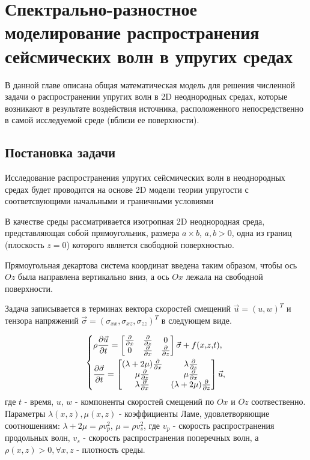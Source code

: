 \section{Спектрально-разностное моделирование распространения сейсмических волн в упругих средах}

В данной главе описана общая математическая модель для решения численной задачи о распространении
упругих волн в 2D неоднородных средах, которые возникают в результате воздействия источника,
расположенного непосредственно в самой исследуемой среде (вблизи ее поверхности).

\subsection{Постановка задачи}
Исследование распространения упругих сейсмических волн в неоднородных средах будет проводится на 
основе 2D модели теории упругости с соответсвующими начальными и граничными условиями \cite{novac, filon, shem}

В качестве среды рассматривается изотропная 2D неоднородная среда, представляющая собой прямоугольник, размера $a \times b$, $a, b>0$,
одна из границ (плоскость $z = 0$) которого является свободной поверхностью.

Прямоугольная декартова система координат введена таким образом, чтобы ось $Oz$ была направлена вертикально вниз,
а ось $Ox$ лежала на свободной поверхности.


Задача записывается в терминах вектора скоростей смещений $\vec{u}={(u, w)}^T$
и тензора напряжений $\vec{\sigma}=(\sigma_{xx}, \sigma_{xz}, \sigma_{zz})^T$ в следующем виде.

\begin{equation}
\label{eq:1}
\begin{dcases}
	\rho\frac{\partial{\vec{u}}}{\partial{t}}
	=\begin{bmatrix}
    \frac{\partial{}}{\partial{x}} & \frac{\partial{}}{\partial{z}} & 0 \\
    0 & \frac{\partial{}}{\partial{x}} & \frac{\partial{}}{\partial{z}}
	\end{bmatrix}
	\vec{\sigma} + f(x{,} z{,} t), \\
	\frac{\partial{\vec{\sigma}}}{\partial{t}}
	=\begin{bmatrix}
    (\lambda+2\mu)\frac{\partial{}}{\partial{x}} & \lambda\frac{\partial{}}{\partial{z}} \\
    \mu\frac{\partial{}}{\partial{z}} & \mu\frac{\partial{}}{\partial{x}} \\
    \lambda\frac{\partial{}}{\partial{x}} & (\lambda+2\mu)\frac{\partial{}}{\partial{z}}
	\end{bmatrix}
	\vec{u},
\end{dcases}
\end{equation}
где $t$ - время, $u$, $w$ - компоненты скоростей смещений по $Ox$ и $Oz$ соотвественно.
Параметры $\lambda(x,z), \mu(x,z)$ - коэффициенты Ламе, удовлетворяющие соотношениям: $\lambda + 2\mu=\rho{v}_p^2$, $\mu=\rho{v}_s^2$, 
где $v_p$ - скорость распространения продольных волн, $v_s$ - скорость распространения поперечных волн,
а $\rho(x,z)>0, \forall x,z$ - плотность среды.

